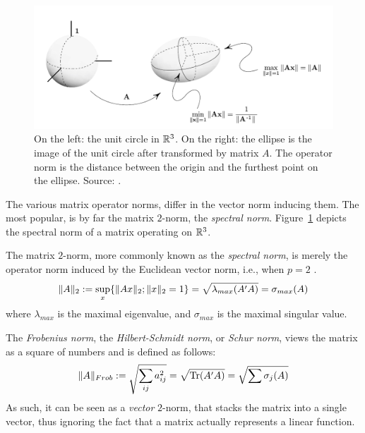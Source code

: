 \begin{figure}
\centering
\includegraphics[width=0.7\linewidth]{art/operator_norm}
\caption{
\footnotesize
On the left: the unit circle in $\mathbb{R}^3$. 
On the right: the ellipse is the image of the unit circle after transformed by matrix $A$. The operator norm is the distance between the origin and the furthest point on the ellipse. 
\newline Source: \cite{meyer_matrix_2001}.}
\label{fig:operator_norm}
\end{figure}

The various matrix operator norms, differ in the vector norm inducing them.
The most popular, is by far the matrix $2$-norm, \aka the \emph{spectral norm}.
Figure~\ref{fig:operator_norm} depicts the spectral norm of a matrix operating on $\mathbb{R}^3$. 

\begin{definition}
The matrix $2$-norm, more commonly known as the \emph{spectral norm}, is merely the operator norm induced by the Euclidean vector norm, i.e., when $p=2$ . 
\begin{align}
	\Vert A \Vert_2:= \sup_x \{ \Vert Ax \Vert_2; \Vert x \Vert_2=1 \}	= \sqrt{\lambda_{max}(A'A)} = \sigma_{max}(A)
\end{align}
where $\lambda_{max}$ is the maximal eigenvalue, and $\sigma_{max}$ is the maximal singular value. 
\end{definition}



\begin{definition}
The \emph{Frobenius norm}, \aka the \emph{Hilbert-Schmidt norm}, or \emph{Schur norm}, views the matrix as a square of numbers and is defined as follows:
\begin{align}
	\Vert A \Vert_{Frob}:= \sqrt{\sum_{ij} a_{ij}^2} = \sqrt{\operatorname{Tr}(A'A)} = \sqrt{\sum \sigma_{j}(A)}
\end{align}
As such, it can be seen as a \emph{vector} $2$-norm, that stacks the matrix into a single vector, thus ignoring the fact that a matrix actually represents a linear function. 
\end{definition}

